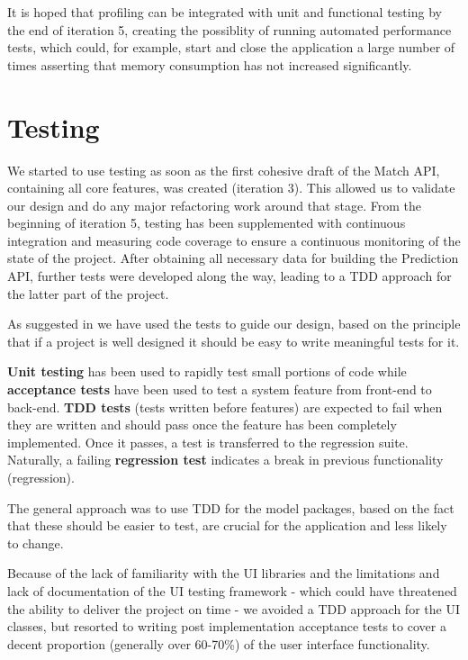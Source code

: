 \documentclass[10pt]{report}
\begin{document}
It is hoped that profiling can be integrated with unit and functional testing by the end of iteration 5, creating the possiblity of running automated performance tests, which could, for example, start and close the application a large number of times asserting that memory consumption has not increased significantly.

\section{Testing}
\label{sec-testing}

We started to use testing as soon as the first cohesive draft of the Match API, containing all core features, was created (iteration 3). This allowed us to validate our design and do any major refactoring work around that stage. From the beginning of iteration 5, testing has been supplemented with continuous integration and measuring code coverage to ensure a continuous monitoring of the state of the project. After obtaining all necessary data for building the Prediction API, further tests were developed along the way, leading to a TDD approach for the latter part of the project.

As suggested in \cite{bk-testing} we have used the tests to guide our design, based on the principle that if a project is well designed it should be easy to write meaningful tests for it.

\textbf{Unit testing} has been used to rapidly test small portions of code while \textbf{acceptance tests} have been used to test a system feature from front-end to back-end. \textbf {TDD tests} (tests written before features) are expected to fail when they are written and should pass once the feature has been completely implemented. Once it passes, a test is transferred to the regression suite. Naturally, a failing \textbf{regression test} indicates a break in previous functionality (regression).

The general approach was to use TDD for the model packages, based on the fact that these should be easier to test, are crucial for the application and less likely to change.

Because of the lack of familiarity with the UI libraries and the limitations and lack of documentation of the UI testing framework - which could have threatened the ability to deliver the project on time - we avoided a TDD approach for the UI classes, but resorted to writing post implementation acceptance tests to cover a decent proportion (generally over 60-70\%) of the user interface functionality.
\end{document}

